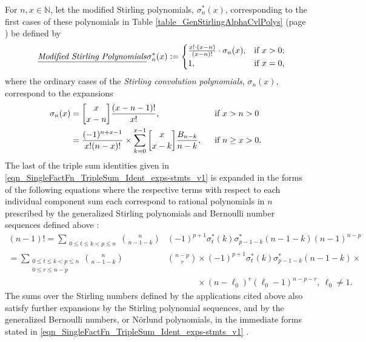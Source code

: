 \documentclass[12pt,reqno]{article}
\numberwithin{sfootnote}{section}
\newcommand{\tableref}[1]{Table \ref{#1} (page \pageref{#1})}
\numberwithin{equation}{section}
\newcommand{\tagtext}[1]{\tag*{\underline{\textit{#1}}}}
\theoremstyle{plain}
\theoremstyle{definition}
\theoremstyle{remark}
\newcommand{\cf}[0]{cf.\ }
\newcommand{\defequals}{\ensuremath{\vcentcolon=}}
\newcommand{\gkpSI}[2]{\ensuremath{\genfrac{\lbrack}{\rbrack}{0pt}{}{#1}{#2}}}
\begin{document}
For $n, x \in \mathbb{N}$, 
let the modified Stirling polynomials, $\sigma_n^{\ast}(x)$, 
corresponding to the first cases of these polynomials in 
\tableref{table_GenStirlingAlphaCvlPolys} be defined by 
\begin{align*} 
\tagtext{Modified Stirling Polynomials} 
\sigma_n^{\ast}(x) & \defequals 
     \begin{cases} 
     \frac{x! \cdot (x-n)}{(x-n)!} \cdot \sigma_n(x), & 
     \text{if $x > 0$;} \\ 
     1, & \text{if $x = 0$,} 
     \end{cases} 
\end{align*} 
where the ordinary cases of the 
\emph{Stirling convolution polynomials}, $\sigma_n(x)$, 
correspond to the expansions 
\citep[\S 6.2, Ex.\ 6.77]{GKP} 
\begin{align*} 
\sigma_n(x) & = 
     \gkpSI{x}{x-n} \frac{(x-n-1)!}{x!},\ && 
     \text{ if $x > n > 0$ } \\ 
     & = 
     \frac{(-1)^{n+x-1}}{x! (n-x)!} \times 
     \sum_{k=0}^{x-1} \gkpSI{x}{x-k} \frac{B_{n-k}}{n-k},\ && 
     \text{ if $n \geq x > 0$. } 
\end{align*} 
The last of the triple sum identities given in 
\eqref{eqn_SingleFactFn_TripleSum_Ident_exps-stmts_v1} is expanded 
in the forms of the following equations where the respective 
terms with respect to each individual component sum each correspond to 
rational polynomials in $n$ prescribed by the generalized 
Stirling polynomials and Bernoulli number sequences 
defined above \citep[\cf \S 6.2, \S 7.4]{GKP} \citep{MULTIFACTJIS,CVLPOLYS}: 
\begin{align*} 
(n-1)! = 
     \sum\limits_{\substack{0 \leq t \leq k < p \leq n}} 
     \binom{n}{n-1-k} & (-1)^{p+1} 
     \sigma_t^{\ast}(k) \sigma_{p-1-k}^{\ast}(n-1-k) 
     (n-1)^{n-p} \\ 
     = 
     \sum\limits_{\substack{0 \leq t \leq k < p \leq n \\ 
                            0 \leq r \leq n-p}} 
     \binom{n}{n-1-k} & \binom{n-p}{r} \times (-1)^{p+1} 
     \sigma_t^{\ast}(k) \sigma_{p-1-k}^{\ast}(n-1-k) \times \\ 
     & \phantom{\binom{n-p}{r}} \times 
     (n-\ell_0)^{r} (\ell_0-1)^{n-p-r},\ 
     \ell_0 \neq 1. 
\end{align*} 
The sums over the Stirling numbers defined by the applications 
cited above also satisfy further expansions by the 
Stirling polynomial sequences, and by the 
generalized Bernoulli numbers, or N\"{o}rlund polynomials, 
in the immediate forms stated in 
\eqref{eqn_SingleFactFn_TripleSum_Ident_exps-stmts_v1} 
\citep{MULTIFACTJIS}. 
\end{document}
